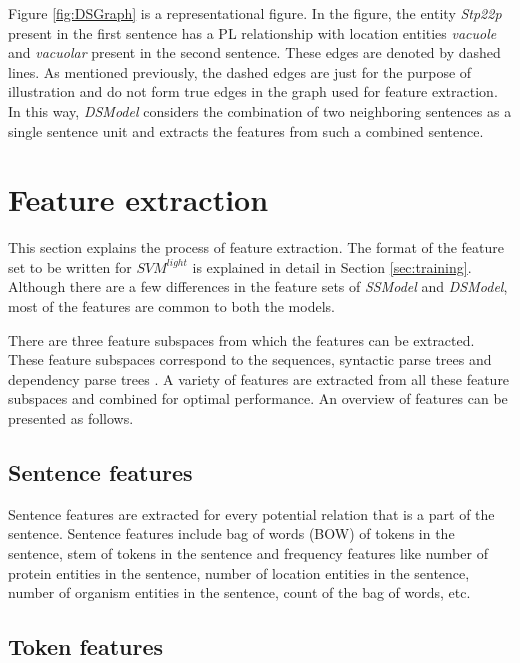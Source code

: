 Figure \ref{fig:DSGraph} is a representational figure. In the figure, the entity \textit{Stp22p} present in the first sentence has a PL relationship with location entities \textit{vacuole} and \textit{vacuolar} present in the second sentence. These edges are denoted by dashed lines. As mentioned previously, the dashed edges are just for the purpose of illustration and do not form true edges in the graph used for feature extraction. In this way, \textit{DSModel} considers the combination of two neighboring sentences as a single sentence unit and extracts the features from such a combined sentence.



\section{Feature extraction}\label{sec:featExp}

This section explains the process of feature extraction. The format of the feature set to be written for $SVM^{light}$ is explained in detail in Section \ref{sec:training}. Although there are a few differences in the feature sets of \textit{SSModel} and \textit{DSModel}, most of the features are common to both the models. 

There are three feature subspaces from which the features can be extracted. These feature subspaces correspond to the sequences, syntactic parse trees and dependency parse trees \cite{jiang2007systematic}. A variety of features are extracted from all these feature subspaces and combined for optimal performance. An overview of features can be presented as follows.

\subsection*{Sentence features}

Sentence features are extracted for every potential relation that is a part of the sentence. Sentence features include bag of words (BOW) of tokens in the sentence, stem of tokens in the sentence and frequency features like number of protein entities in the sentence, number of location entities in the sentence, number of organism entities in the sentence, count of the bag of words, etc.

\subsection*{Token features}

